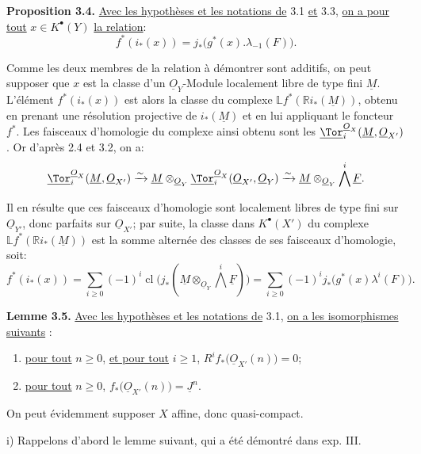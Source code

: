 
\textbf{Proposition 3.4.} \uline{Avec les hypothèses et les notations de} 3.1 \uline{et} 3.3, \uline{on a pour tout} \(x\in K^{\bullet}(Y)\) \uline{la relation}:
\[
f^*(i_*(x))=j_*\bigl(g^*(x).\lambda_{-1}(F)\bigr).
\]

Comme les deux membres de la relation à démontrer sont additifs, on peut supposer que \(x\) est la classe d'un \(\underline{O}_Y\)-Module localement libre de type fini \(\underline{M}\). L'élément \(f^*(i_*(x))\) est alors la classe du complexe \(\mathbb Lf^*(\mathbb Ri_*(\underline{M}))\), obtenu en prenant une résolution projective de \(i_*(\underline{M})\) et en lui appliquant le foncteur \(f^*\). Les faisceaux d'homologie du complexe ainsi obtenu sont les \(\underline{\Tor}_i^{\underline{O}_X}(\underline{M},\underline{O}_{X'})\). Or d'après 2.4 et 3.2, on a:
\[
\underline{\Tor}_i^{\underline{O}_X}(\underline{M},\underline{O}_{X'})
\xrightarrow{\sim}
\underline{M}\otimes_{\underline{O}_Y}\underline{\Tor}_i^{\underline{O}_X}(\underline{O}_{X'},\underline{O}_Y)
\xrightarrow{\sim}
\underline{M}\otimes_{\underline{O}_Y}\bigwedge^i\underline{F}.
\]

Il en résulte que ces faisceaux d'homologie sont localement libres de type fini sur \(\underline{O}_{Y'}\), donc parfaits sur \(\underline{O}_{X'}\); par suite, la classe dans \(K^{\bullet}(X')\) du complexe \(\mathbb Lf^*(\mathbb Ri_*(\underline{M}))\) est la somme alternée des classes de ses faisceaux d'homologie, soit:
\[
f^*(i_*(x))
=\sum_{i\ge0}(-1)^i\operatorname{cl}
\bigl(j_*(\underline{M}\otimes_{\underline{O}_Y}\bigwedge^i\underline{F})\bigr)
=\sum_{i\ge0}(-1)^i
j_*\bigl(g^*(x)\lambda^i(F)\bigr).
\]

\textbf{Lemme 3.5.} \uline{Avec les hypothèses et les notations de} 3.1, \uline{on a les isomorphismes suivants} :
\begin{enumerate}[label=\roman*)]
\item \uline{pour tout} \(n\ge0\), \uline{et pour tout} \(i\ge1\), \(R^if_*\bigl(\underline{O}_{X'}(n)\bigr)=0\);
\item \uline{pour tout} \(n\ge0\), \(f_*\bigl(\underline{O}_{X'}(n)\bigr)=\underline{J}^n\).
\end{enumerate}

On peut évidemment supposer \(X\) affine, donc quasi-compact.

i) Rappelons d'abord le lemme suivant, qui a été démontré dans exp. III.

